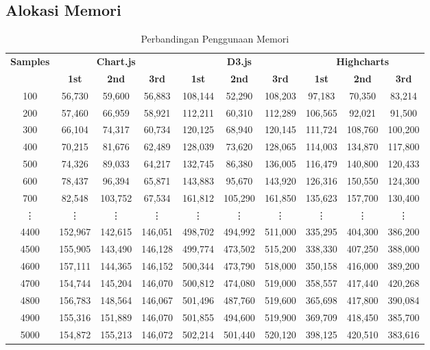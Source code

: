 \subsection{Alokasi Memori}
\begin{table}[H]
	\centering
	\caption{Perbandingan Penggunaan Memori}
	\small
	\begin{tabular}{|c|ccc|ccc|ccc|}
		\hline
		\textbf{Samples} & \multicolumn{3}{c|}{\textbf{Chart.js}} & \multicolumn{3}{c|}{\textbf{D3.js}} & \multicolumn{3}{c|}{\textbf{Highcharts}} \\
		& \textbf{1st} & \textbf{2nd} & \textbf{3rd} & \textbf{1st} & \textbf{2nd} & \textbf{3rd} & \textbf{1st} & \textbf{2nd} & \textbf{3rd} \\
		\hline
		100   & 56,730  & 59,600  & 56,883  & 108,144 & 52,290  & 108,203 & 97,183  & 70,350  & 83,214 \\
		200   & 57,460  & 66,959  & 58,921  & 112,211 & 60,310  & 112,289 & 106,565 & 92,021  & 91,500 \\
		300   & 66,104  & 74,317  & 60,734  & 120,125 & 68,940  & 120,145 & 111,724 & 108,760 & 100,200 \\
		400   & 70,215  & 81,676  & 62,489  & 128,039 & 73,620  & 128,065 & 114,003 & 134,870 & 117,800 \\
		500   & 74,326  & 89,033  & 64,217  & 132,745 & 86,380  & 136,005 & 116,479 & 140,800 & 120,433 \\
		600   & 78,437  & 96,394  & 65,871  & 143,883 & 95,670  & 143,920 & 126,316 & 150,550 & 124,300 \\
		700   & 82,548  & 103,752 & 67,534  & 161,812 & 105,290 & 161,850 & 135,623 & 157,700 & 130,400 \\
		\vdots & \vdots  & \vdots  & \vdots  & \vdots  & \vdots  & \vdots  & \vdots  & \vdots  & \vdots \\
		4400  & 152,967 & 142,615 & 146,051 & 498,702 & 494,992 & 511,000 & 335,295 & 404,300 & 386,200 \\
		4500  & 155,905 & 143,490 & 146,128 & 499,774 & 473,502 & 515,200 & 338,330 & 407,250 & 388,000 \\
		4600  & 157,111 & 144,365 & 146,152 & 500,344 & 473,790 & 518,000 & 350,158 & 416,000 & 389,200 \\
		4700  & 154,744 & 145,204 & 146,070 & 500,812 & 474,080 & 519,000 & 358,557 & 417,440 & 420,268 \\
		4800  & 156,783 & 148,564 & 146,067 & 501,496 & 487,760 & 519,600 & 365,698 & 417,800 & 390,084 \\
		4900  & 155,316 & 151,889 & 146,070 & 501,855 & 494,600 & 519,900 & 369,709 & 418,450 & 385,700 \\
		5000  & 154,872 & 155,213 & 146,072 & 502,214 & 501,440 & 520,120 & 398,125 & 420,510 & 383,616 \\
		\hline
	\end{tabular}
\end{table}
